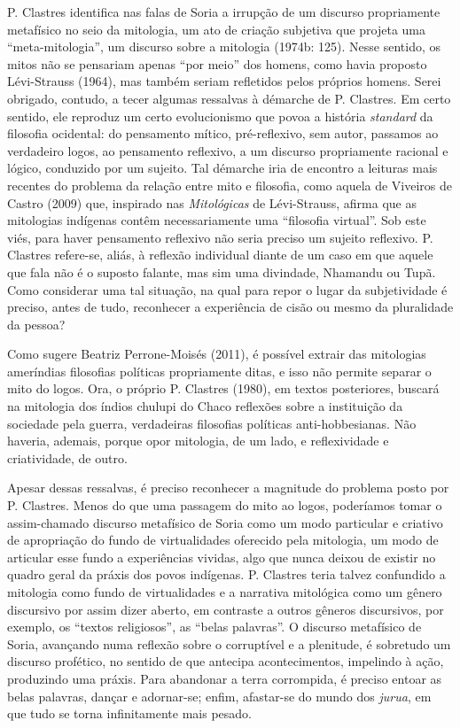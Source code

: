 P. Clastres identifica nas falas de Soria a irrupção de um discurso
propriamente metafísico no seio da mitologia, um ato de criação
subjetiva que projeta uma ``meta-mitologia'', um discurso sobre a
mitologia (1974b: 125). Nesse sentido, os mitos não se pensariam apenas
``por meio'' dos homens, como havia proposto Lévi-Strauss (1964), mas
também seriam refletidos pelos próprios homens. Serei obrigado, contudo,
a tecer algumas ressalvas à démarche de P. Clastres. Em certo sentido,
ele reproduz um certo evolucionismo que povoa a história \emph{standard}
da filosofia ocidental: do pensamento mítico, pré-reflexivo, sem autor,
passamos ao verdadeiro logos, ao pensamento reflexivo, a um discurso
propriamente racional e lógico, conduzido por um sujeito. Tal démarche
iria de encontro a leituras mais recentes do problema da relação entre
mito e filosofia, como aquela de Viveiros de Castro (2009) que,
inspirado nas \emph{Mitológicas} de Lévi-Strauss, afirma que as
mitologias indígenas contêm necessariamente uma ``filosofia virtual''.
Sob este viés, para haver pensamento reflexivo não seria preciso um
sujeito reflexivo. P. Clastres refere-se, aliás, à reflexão individual
diante de um caso em que aquele que fala não é o suposto falante, mas
sim uma divindade, Nhamandu ou Tupã. Como considerar uma tal situação,
na qual para repor o lugar da subjetividade é preciso, antes de tudo,
reconhecer a experiência de cisão ou mesmo da pluralidade da pessoa?

Como sugere Beatriz Perrone-Moisés (2011), é possível extrair das
mitologias ameríndias filosofias políticas propriamente ditas, e isso
não permite separar o mito do logos. Ora, o próprio P. Clastres (1980),
em textos posteriores, buscará na mitologia dos índios chulupi do Chaco
reflexões sobre a instituição da sociedade pela guerra, verdadeiras
filosofias políticas anti-hobbesianas. Não haveria, ademais, porque opor
mitologia, de um lado, e reflexividade e criatividade, de outro.

Apesar dessas ressalvas, é preciso reconhecer a magnitude do problema
posto por P. Clastres. Menos do que uma passagem do mito ao logos,
poderíamos tomar o assim-chamado discurso metafísico de Soria como um
modo particular e criativo de apropriação do fundo de virtualidades
oferecido pela mitologia, um modo de articular esse fundo a experiências
vividas, algo que nunca deixou de existir no quadro geral da práxis dos
povos indígenas. P. Clastres teria talvez confundido a mitologia como
fundo de virtualidades e a narrativa mitológica como um gênero
discursivo por assim dizer aberto, em contraste a outros gêneros
discursivos, por exemplo, os ``textos religiosos'', as ``belas
palavras''. O discurso metafísico de Soria, avançando numa reflexão
sobre o corruptível e a plenitude, é sobretudo um discurso profético, no
sentido de que antecipa acontecimentos, impelindo à ação, produzindo uma
práxis. Para abandonar a terra corrompida, é preciso entoar as belas
palavras, dançar e adornar-se; enfim, afastar-se do mundo dos
\emph{jurua}, em que tudo se torna infinitamente mais pesado.

